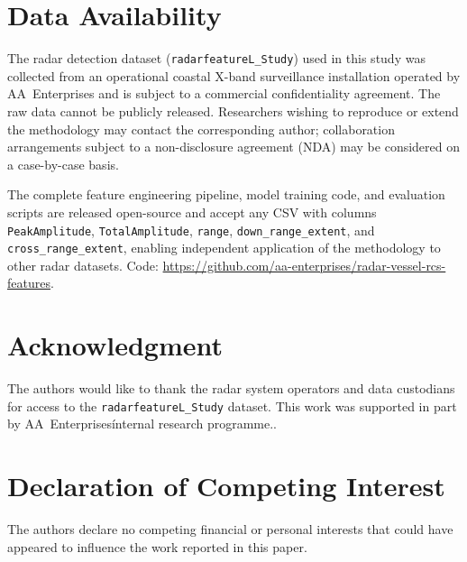 \documentclass[journal]{IEEEtran}
\begin{document}
\section*{Data Availability}
The radar detection dataset (\texttt{radarfeatureL\_Study}) used in this
study was collected from an operational coastal X-band surveillance
installation operated by AA~Enterprises and is subject to a commercial
confidentiality agreement. The raw data cannot be publicly released.
Researchers wishing to reproduce or extend the methodology may contact
the corresponding author; collaboration arrangements subject to a
non-disclosure agreement (NDA) may be considered on a case-by-case basis.

The complete feature engineering pipeline, model training code, and
evaluation scripts are released open-source and accept any CSV with
columns \texttt{PeakAmplitude}, \texttt{TotalAmplitude}, \texttt{range},
\texttt{down\_range\_extent}, and \texttt{cross\_range\_extent}, enabling
independent application of the methodology to other radar datasets.
Code: \url{https://github.com/aa-enterprises/radar-vessel-rcs-features}.

\section*{Acknowledgment}
The authors would like to thank the radar system operators and data custodians for access to the \texttt{radarfeatureL\_Study} dataset. This work was supported in part by AA~Enterprises\' internal research programme..

\section*{Declaration of Competing Interest}
The authors declare no competing financial or personal interests that could have appeared to influence the work reported in this paper.
\end{document}
